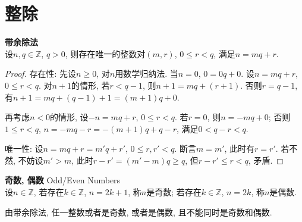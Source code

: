 \section{整除}

\begin{pro} \textbf{带余除法}\\
设$n,q \in \mathbb{Z}$, $q>0$, 则存在唯一的整数对$(m,r)$, $0\le r<q$, 满足$n=mq+r$. 
\label{pro:div_rem}
\end{pro}
\begin{proof}
存在性: 先设$n\ge 0$, 对$n$用数学归纳法. 当$n=0$, $0=0q+0$. 设$n=mq+r$, $0\le r<q$. 对$n+1$的情形, 若$r<q-1$, 则$n+1=mq+(r+1)$. 否则$r=q-1$, 有$n+1=mq+(q-1)+1=(m+1)q+0$. 
\par 再考虑$n<0$的情形, 设$-n=mq+r$, $0\le r<q$. 若$r=0$, 则$n=-mq+0$; 否则$1\le r<q$, $n=-mq-r=-(m+1)q+q-r$, 满足$0<q-r<q$. 
\par 唯一性: 设$n=mq+r=m'q+r'$, $0\le r,r'<q$. 断言$m=m'$, 此时有$r=r'$. 若不然, 不妨设$m'>m$, 此时$r-r'=(m'-m)q\ge q$, 但$r-r'\le r<q$, 矛盾. 
\end{proof}

\begin{dfn} \textbf{奇数, 偶数} Odd/Even Numbers\\
设$n\in \mathbb{Z}$, 若存在$k\in \mathbb{Z}$, $n=2k+1$, 称$n$是奇数; 若存在$k\in \mathbb{Z}$, $n=2k$, 称$n$是偶数. 
\end{dfn}
由带余除法, 任一整数或者是奇数, 或者是偶数, 且不能同时是奇数和偶数. 

